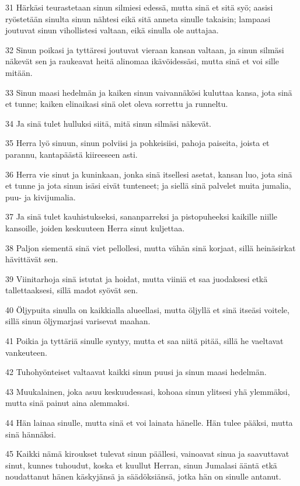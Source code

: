 \par 31 Härkäsi teurastetaan sinun silmiesi edessä, mutta sinä et sitä syö; aasisi ryöstetään sinulta sinun nähtesi eikä sitä anneta sinulle takaisin; lampaasi joutuvat sinun vihollistesi valtaan, eikä sinulla ole auttajaa.
\par 32 Sinun poikasi ja tyttäresi joutuvat vieraan kansan valtaan, ja sinun silmäsi näkevät sen ja raukeavat heitä alinomaa ikävöidessäsi, mutta sinä et voi sille mitään.
\par 33 Sinun maasi hedelmän ja kaiken sinun vaivannäkösi kuluttaa kansa, jota sinä et tunne; kaiken elinaikasi sinä olet oleva sorrettu ja runneltu.
\par 34 Ja sinä tulet hulluksi siitä, mitä sinun silmäsi näkevät.
\par 35 Herra lyö sinuun, sinun polviisi ja pohkeisiisi, pahoja paiseita, joista et parannu, kantapäästä kiireeseen asti.
\par 36 Herra vie sinut ja kuninkaan, jonka sinä itsellesi asetat, kansan luo, jota sinä et tunne ja jota sinun isäsi eivät tunteneet; ja siellä sinä palvelet muita jumalia, puu- ja kivijumalia.
\par 37 Ja sinä tulet kauhistukseksi, sananparreksi ja pistopuheeksi kaikille niille kansoille, joiden keskuuteen Herra sinut kuljettaa.
\par 38 Paljon siementä sinä viet pellollesi, mutta vähän sinä korjaat, sillä heinäsirkat hävittävät sen.
\par 39 Viinitarhoja sinä istutat ja hoidat, mutta viiniä et saa juodaksesi etkä tallettaaksesi, sillä madot syövät sen.
\par 40 Öljypuita sinulla on kaikkialla alueellasi, mutta öljyllä et sinä itseäsi voitele, sillä sinun öljymarjasi varisevat maahan.
\par 41 Poikia ja tyttäriä sinulle syntyy, mutta et saa niitä pitää, sillä he vaeltavat vankeuteen.
\par 42 Tuhohyönteiset valtaavat kaikki sinun puusi ja sinun maasi hedelmän.
\par 43 Muukalainen, joka asuu keskuudessasi, kohoaa sinun ylitsesi yhä ylemmäksi, mutta sinä painut aina alemmaksi.
\par 44 Hän lainaa sinulle, mutta sinä et voi lainata hänelle. Hän tulee pääksi, mutta sinä hännäksi.
\par 45 Kaikki nämä kiroukset tulevat sinun päällesi, vainoavat sinua ja saavuttavat sinut, kunnes tuhoudut, koska et kuullut Herran, sinun Jumalasi ääntä etkä noudattanut hänen käskyjänsä ja säädöksiänsä, jotka hän on sinulle antanut.
